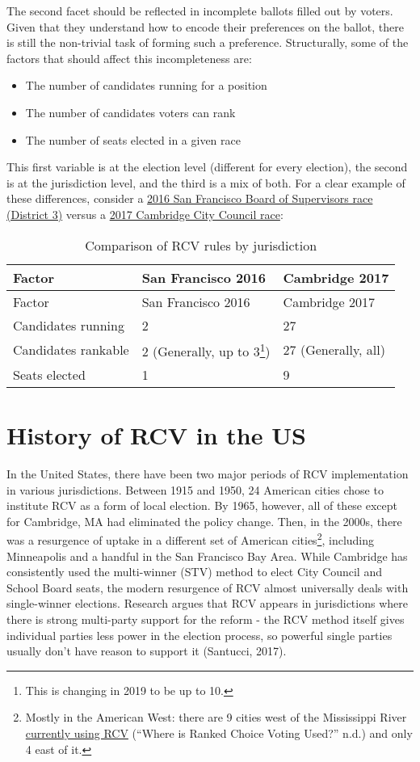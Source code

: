 \documentclass[12pt,twoside]{reedthesis}
\begin{document}
The second facet should be reflected in incomplete ballots filled out by voters. Given that they understand how to encode their preferences on the ballot, there is still the non-trivial task of forming such a preference. Structurally, some of the factors that should affect this incompleteness are:
\begin{itemize}
\item
  The number of candidates running for a position
\item
  The number of candidates voters can rank
\item
  The number of seats elected in a given race
\end{itemize}
This first variable is at the election level (different for every election), the second is at the jurisdiction level, and the third is a mix of both. For a clear example of these differences, consider a \href{https://sfelections.org/results/20161108/data/20161206/d3/20161206_d3.pdf}{2016 San Francisco Board of Supervisors race (District 3)} versus a \href{https://www.cambridgema.gov/election2017/Council\%20Order\%20Round.htm}{2017 Cambridge City Council race}:
\begin{longtable}[]{@{}lll@{}}
\caption{Comparison of RCV rules by jurisdiction}\tabularnewline
\toprule
Factor & San Francisco 2016 & Cambridge 2017\tabularnewline
\midrule
\endfirsthead
\toprule
Factor & San Francisco 2016 & Cambridge 2017\tabularnewline
\midrule
\endhead
Candidates running & 2 & 27\tabularnewline
Candidates rankable & 2 (Generally, up to 3\footnote{This is changing in 2019 to be up to 10.}) & 27 (Generally, all)\tabularnewline
Seats elected & 1 & 9\tabularnewline
\bottomrule
\end{longtable}
\hypertarget{history-of-rcv-in-the-us}{%
\section{History of RCV in the US}\label{history-of-rcv-in-the-us}}

In the United States, there have been two major periods of RCV implementation in various jurisdictions. Between 1915 and 1950, 24 American cities chose to institute RCV as a form of local election. By 1965, however, all of these except for Cambridge, MA had eliminated the policy change. Then, in the 2000s, there was a resurgence of uptake in a different set of American cities\footnote{Mostly in the American West: there are 9 cities west of the Mississippi River \href{https://www.fairvote.org/where_is_ranked_choice_voting_used}{currently using RCV} (``Where is Ranked Choice Voting Used?'' n.d.) and only 4 east of it.}, including Minneapolis and a handful in the San Francisco Bay Area. While Cambridge has consistently used the multi-winner (STV) method to elect City Council and School Board seats, the modern resurgence of RCV almost universally deals with single-winner elections. Research argues that RCV appears in jurisdictions where there is strong multi-party support for the reform - the RCV method itself gives individual parties less power in the election process, so powerful single parties usually don't have reason to support it (Santucci, 2017).
\end{document}
